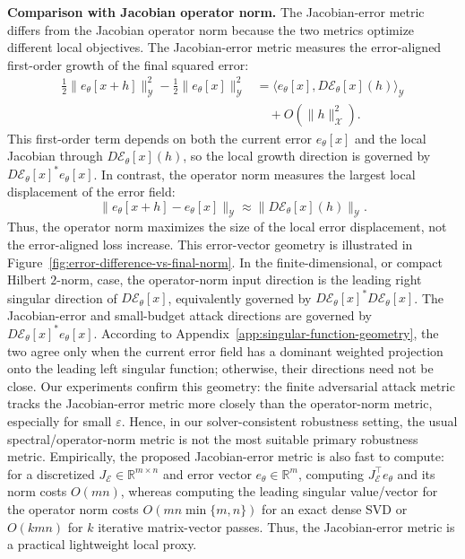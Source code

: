 \documentclass[letterpaper]{article} %
\newcommand{\figref}[1]{Figure~\ref{#1}}
\newcommand{\appref}[1]{Appendix~\ref{#1}}
\begin{document}
\smallskip
\noindent\textbf{Comparison with Jacobian operator norm.}
The Jacobian-error metric differs from the Jacobian operator norm because the
two metrics optimize different local objectives. The
Jacobian-error metric measures the error-aligned first-order growth of the
final squared error:
\begin{align}
  \frac{1}{2}\|e_\theta[x+h]\|_{\mathcal{Y}}^2
  -
  \frac{1}{2}\|e_\theta[x]\|_{\mathcal{Y}}^2
  &=
  \bigl\langle e_\theta[x],
  D\mathcal{E}_\theta[x](h)\bigr\rangle_{\mathcal{Y}}
  \nonumber\\
  &\quad+
  O(\|h\|_{\mathcal{X}}^2).
\end{align}
This first-order term depends on both the current error $e_\theta[x]$ and the
local Jacobian through $D\mathcal{E}_\theta[x](h)$, so the local growth
direction is governed by $D\mathcal{E}_\theta[x]^*e_\theta[x]$. In contrast,
the operator norm measures the largest local displacement of the error field:
\begin{equation}
  \|e_\theta[x+h]-e_\theta[x]\|_{\mathcal{Y}}
  \approx
  \|D\mathcal{E}_\theta[x](h)\|_{\mathcal{Y}}.
\end{equation}
Thus, the operator norm maximizes the size of the local error displacement,
not the error-aligned loss increase. This error-vector geometry is illustrated
in \figref{fig:error-difference-vs-final-norm}.
In the finite-dimensional, or compact Hilbert $2$-norm, case, the
operator-norm input direction is the leading right singular direction of
$D\mathcal{E}_\theta[x]$, equivalently governed by
$D\mathcal{E}_\theta[x]^*D\mathcal{E}_\theta[x]$. The Jacobian-error and
small-budget attack directions are governed by
$D\mathcal{E}_\theta[x]^*e_\theta[x]$. According to
\appref{app:singular-function-geometry}, the two agree only when the current
error field has a dominant weighted projection onto the leading left singular
function; otherwise, their directions need not be close. Our experiments
confirm this geometry: the finite adversarial attack metric tracks the
Jacobian-error metric more closely than the operator-norm metric, especially
for small $\varepsilon$. Hence, in our
solver-consistent robustness setting, the usual spectral/operator-norm metric
is not the most suitable primary robustness metric. Empirically, the proposed
Jacobian-error metric is also fast to compute: for a discretized
$J_{\mathcal{E}}\in\mathbb{R}^{m\times n}$ and error vector
$e_\theta\in\mathbb{R}^{m}$, computing
$J_{\mathcal{E}}^\top e_\theta$ and its norm costs $O(mn)$, whereas computing
the leading singular value/vector for the operator norm costs
$O(mn\min\{m,n\})$ for an exact dense SVD or $O(kmn)$ for $k$ iterative
matrix-vector passes. Thus, the Jacobian-error metric is a practical
lightweight local proxy.
\end{document}
